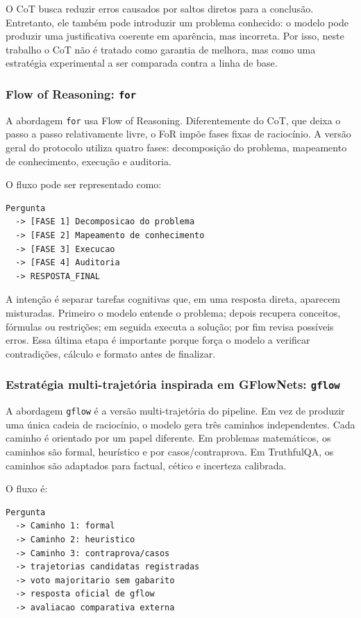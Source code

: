 \documentclass[12pt]{article}
\begin{document}
O CoT busca reduzir erros causados por saltos diretos para a conclusão. Entretanto, ele também pode introduzir um problema conhecido: o modelo pode produzir uma justificativa coerente em aparência, mas incorreta. Por isso, neste trabalho o CoT não é tratado como garantia de melhora, mas como uma estratégia experimental a ser comparada contra a linha de base.

\subsubsection{Flow of Reasoning: \texttt{for}}

A abordagem \texttt{for} usa Flow of Reasoning. Diferentemente do CoT, que deixa o passo a passo relativamente livre, o FoR impõe fases fixas de raciocínio. A versão geral do protocolo utiliza quatro fases: decomposição do problema, mapeamento de conhecimento, execução e auditoria.

O fluxo pode ser representado como:

\begin{verbatim}
Pergunta
  -> [FASE 1] Decomposicao do problema
  -> [FASE 2] Mapeamento de conhecimento
  -> [FASE 3] Execucao
  -> [FASE 4] Auditoria
  -> RESPOSTA_FINAL
\end{verbatim}

A intenção é separar tarefas cognitivas que, em uma resposta direta, aparecem misturadas. Primeiro o modelo entende o problema; depois recupera conceitos, fórmulas ou restrições; em seguida executa a solução; por fim revisa possíveis erros. Essa última etapa é importante porque força o modelo a verificar contradições, cálculo e formato antes de finalizar.

\subsubsection{Estratégia multi-trajetória inspirada em GFlowNets: \texttt{gflow}}

A abordagem \texttt{gflow} é a versão multi-trajetória do pipeline. Em vez de produzir uma única cadeia de raciocínio, o modelo gera três caminhos independentes. Cada caminho é orientado por um papel diferente. Em problemas matemáticos, os caminhos são formal, heurístico e por casos/contraprova. Em TruthfulQA, os caminhos são adaptados para factual, cético e incerteza calibrada.

O fluxo é:

\begin{verbatim}
Pergunta
  -> Caminho 1: formal
  -> Caminho 2: heuristico
  -> Caminho 3: contraprova/casos
  -> trajetorias candidatas registradas
  -> voto majoritario sem gabarito
  -> resposta oficial de gflow
  -> avaliacao comparativa externa
\end{verbatim}
\end{document}
